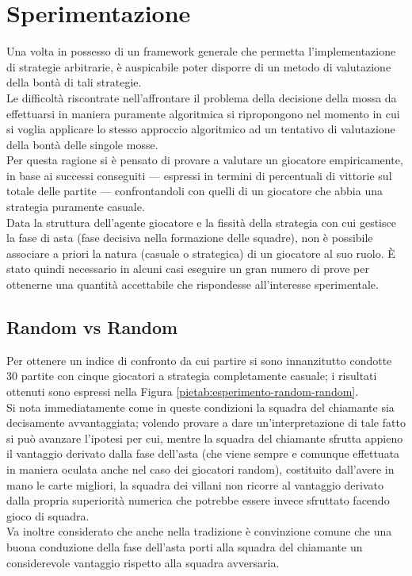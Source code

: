 \chapter*{Sperimentazione}
\graphicspath{{Chapter6/Chapter6Figs/PNG/}{Chapter6/Chapter6Figs/PDF/}{Chapter6/Chapter6Figs/}}

Una volta in possesso di un framework generale che permetta l'implementazione di strategie arbitrarie, è auspicabile poter disporre di un metodo di valutazione della bontà di tali strategie.\\
Le difficoltà riscontrate nell'affrontare il problema della decisione della mossa da effettuarsi in maniera puramente algoritmica si ripropongono nel momento in cui si voglia applicare lo stesso approccio algoritmico ad un tentativo di valutazione della bontà delle singole mosse.\\
Per questa ragione si è pensato di provare a valutare un giocatore empiricamente, in base ai successi conseguiti --- espressi in termini di percentuali di vittorie sul totale delle partite ---  confrontandoli con quelli di un giocatore che abbia una strategia puramente casuale.\\
Data la struttura dell'agente giocatore e la fissità della strategia con cui gestisce la fase di asta (fase decisiva nella formazione delle squadre), non è possibile associare a priori la natura (casuale o strategica) di un giocatore al suo ruolo. È stato quindi necessario in alcuni casi eseguire un gran numero di prove per ottenerne una quantità accettabile che rispondesse all'interesse sperimentale.


\section{Random vs Random}

Per ottenere un indice di confronto da cui partire si sono innanzitutto condotte 30 partite con cinque giocatori a strategia completamente casuale; i risultati ottenuti sono espressi nella Figura \ref{pietab:esperimento-random-random}.\\
Si nota immediatamente come in queste condizioni la squadra del chiamante sia decisamente avvantaggiata; volendo provare a dare un'interpretazione di tale fatto si può avanzare l'ipotesi per cui, mentre la squadra del chiamante sfrutta appieno il vantaggio derivato dalla fase dell'asta (che viene sempre e comunque effettuata in maniera oculata anche nel caso dei giocatori random), costituito dall'avere in mano le carte migliori, la squadra dei villani non ricorre al vantaggio derivato dalla propria superiorità numerica che potrebbe essere invece sfruttato facendo gioco di squadra.\\
Va inoltre considerato che anche nella tradizione è convinzione comune che una buona conduzione della fase dell'asta porti alla squadra del chiamante un considerevole vantaggio rispetto alla squadra avversaria.

